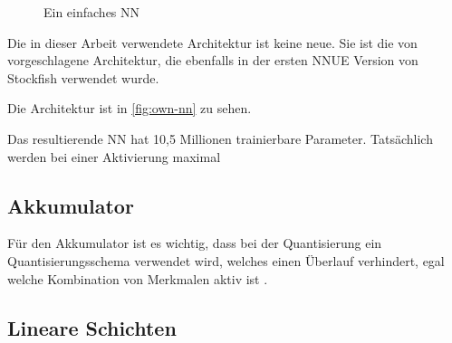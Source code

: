 \begin{figure}
{
  }%
  \caption{Ein einfaches \acl{NN}}
  \label{fig:own-nn}
\end{figure}

Die in dieser Arbeit verwendete Architektur ist keine neue. Sie ist die von \citeauthor{YNasu2018} \cite{YNasu2018} vorgeschlagene Architektur, die ebenfalls in der ersten \ac{NNUE} Version von Stockfish verwendet wurde.

Die Architektur ist in \autoref{fig:own-nn} zu sehen.


Das resultierende \ac{NN} hat 10,5 Millionen trainierbare Parameter. Tatsächlich werden bei einer Aktivierung maximal


\subsection{Akkumulator}


Für den Akkumulator ist es wichtig, dass bei der Quantisierung ein Quantisierungsschema verwendet wird, welches einen Überlauf verhindert, egal welche Kombination von Merkmalen aktiv ist \cite{StockfishNNUE}.

\subsection{Lineare Schichten}

